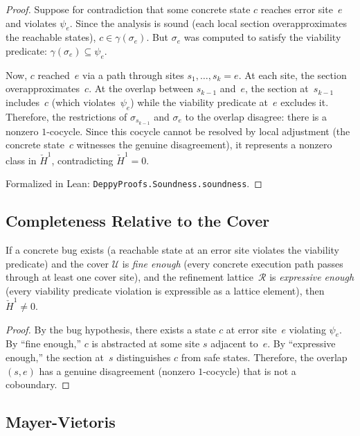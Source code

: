 \documentclass[acmsmall,screen]{acmart}
\theoremstyle{remark}
\newcommand{\Hc}[1]{\check{H}^{#1}}
\begin{document}
\begin{proof}
Suppose for contradiction that some concrete state $c$ reaches error
site~$e$ and violates $\psi_e$.  Since the analysis is sound
(each local section overapproximates the reachable states),
$c \in \gamma(\sigma_e)$.  But $\sigma_e$ was computed to satisfy the
viability predicate: $\gamma(\sigma_e) \subseteq \psi_e$.

Now, $c$ reached~$e$ via a path through sites $s_1, \ldots, s_k = e$.
At each site, the section overapproximates~$c$.  At the overlap between
$s_{k-1}$ and~$e$, the section at~$s_{k-1}$ includes~$c$ (which
violates~$\psi_e$) while the viability predicate at~$e$ excludes it.
Therefore, the restrictions of $\sigma_{s_{k-1}}$ and $\sigma_e$ to
the overlap disagree: there is a nonzero $1$-cocycle.  Since this
cocycle cannot be resolved by local adjustment (the concrete state~$c$
witnesses the genuine disagreement), it represents a nonzero class
in $\Hc{1}$, contradicting $\Hc{1} = 0$.

Formalized in Lean: \texttt{DeppyProofs.Soundness.soundness}.
\end{proof}

\subsection{Completeness Relative to the Cover}\label{sec:completeness}

\begin{theorem}\label{thm:completeness}
If a concrete bug exists (a reachable state at an error site violates
the viability predicate) and the cover $\mathcal{U}$ is
\emph{fine enough} (every concrete execution path passes through at
least one cover site), and the refinement lattice~$\mathcal{R}$ is
\emph{expressive enough} (every viability predicate violation is
expressible as a lattice element), then $\Hc{1} \neq 0$.
\end{theorem}

\begin{proof}
By the bug hypothesis, there exists a state $c$ at error site~$e$
violating $\psi_e$.  By ``fine enough,'' $c$ is abstracted at some site
$s$ adjacent to~$e$.  By ``expressive enough,'' the section at~$s$
distinguishes $c$ from safe states.  Therefore, the overlap $(s, e)$ has
a genuine disagreement (nonzero $1$-cocycle) that is not a coboundary.
\end{proof}

\subsection{Mayer-Vietoris}\label{sec:mayer-vietoris}
\end{document}

